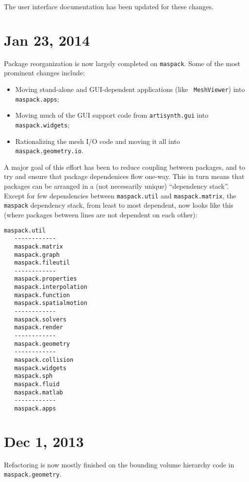 \documentclass{article}
\begin{document}
The user interface documentation has been updated for these changes.

\section*{Jan 23, 2014}

Package reorganization is now largely completed on {\tt maspack}.
Some of the most prominent changes include:

\begin{itemize}

\item Moving stand-alone and GUI-dependent applications (like {\tt
MeshViewer}) into {\tt maspack.apps};

\item Moving much of the GUI support code from {\tt artisynth.gui}
into {\tt maspack.widgets};

\item Rationalizing the mesh I/O code and moving it all
into {\tt maspack.geometry.io}.

\end{itemize}

A major goal of this effort has been to reduce coupling between
packages, and to try and ensure that package dependenices flow
one-way. This in turn means that packages can be arranged in a (not
necessarily unique) ``dependency stack''. Except for few dependencies
between {\tt maspack.util} and {\tt maspack.matrix}, the {\tt maspack}
dependency stack, from least to most dependent, now looks like this
(where packages between lines are not dependent on each other):

\begin{lstlisting}[]
   maspack.util
   ------------
   maspack.matrix
   maspack.graph
   maspack.fileutil
   ------------
   maspack.properties
   maspack.interpolation
   maspack.function
   maspack.spatialmotion
   ------------
   maspack.solvers
   maspack.render
   ------------
   maspack.geometry
   ------------
   maspack.collision
   maspack.widgets
   maspack.sph
   maspack.fluid
   maspack.matlab
   ------------
   maspack.apps
\end{lstlisting}

\section*{Dec 1, 2013}

Refactoring is now mostly finished on the bounding volume hierarchy
code in {\tt maspack.geometry}.
\end{document}
